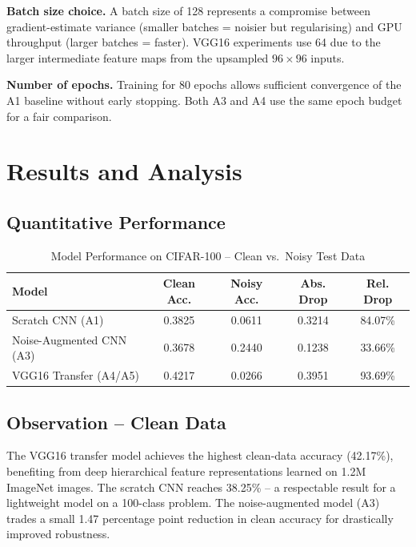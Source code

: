 \documentclass[12pt,a4paper]{article}
\begin{document}
\textbf{Batch size choice.} A batch size of 128 represents a compromise between gradient-estimate variance (smaller batches = noisier but regularising) and GPU throughput (larger batches = faster). VGG16 experiments use 64 due to the larger intermediate feature maps from the upsampled $96\times96$ inputs.

\textbf{Number of epochs.} Training for 80 epochs allows sufficient convergence of the A1 baseline without early stopping. Both A3 and A4 use the same epoch budget for a fair comparison.

\section{Results and Analysis}

\subsection{Quantitative Performance}

\begin{table}[H]
\centering
\caption{Model Performance on CIFAR-100 -- Clean vs.\ Noisy Test Data}
\begin{tabular}{lcccc}
\toprule
\textbf{Model} & \textbf{Clean Acc.} & \textbf{Noisy Acc.} & \textbf{Abs. Drop} & \textbf{Rel. Drop} \\
\midrule
Scratch CNN (A1)           & 0.3825 & 0.0611 & 0.3214 & 84.07\% \\
Noise-Augmented CNN (A3)   & 0.3678 & 0.2440 & 0.1238 & 33.66\% \\
VGG16 Transfer (A4/A5)     & 0.4217 & 0.0266 & 0.3951 & 93.69\% \\
\bottomrule
\end{tabular}
\end{table}

\subsection{Observation -- Clean Data}

The VGG16 transfer model achieves the highest clean-data accuracy (42.17\%), benefiting from deep hierarchical feature representations learned on 1.2M ImageNet images. The scratch CNN reaches 38.25\% -- a respectable result for a lightweight model on a 100-class problem. The noise-augmented model (A3) trades a small 1.47 percentage point reduction in clean accuracy for drastically improved robustness.
\end{document}
